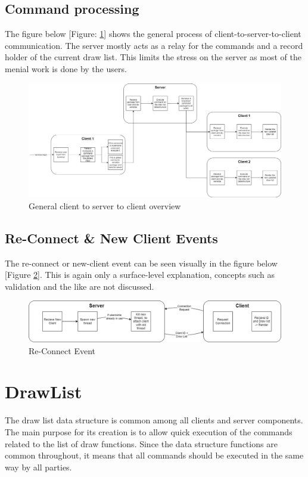 \documentclass[12pt, a4paper]{report}
\begin{document}
\section{Command processing}
The figure below [Figure: \ref{GCSC}] shows the general process of client-to-server-to-client communication. The server mostly acts as a relay for the commands and a record holder of the current draw list. This limits the stress on the server as most of the menial work is done by the users.
\begin{figure}[!htp]
    \centering
    \includegraphics[width=15cm]{Server To Client General.drawio.png}
    \caption{General client to server to client overview}
    \label{GCSC}
\end{figure}

\section{Re-Connect \& New Client Events}
The re-connect or new-client event can be seen visually in the figure below [Figure \ref{RC}]. This is again only a surface-level explanation, concepts such as validation and the like are not discussed.
\begin{figure}[!htp]
    \centering
    \includegraphics[width=15cm]{Re-Connect Event.drawio.png}
    \caption{Re-Connect Event}
    \label{RC}
\end{figure}

\chapter{DrawList}
The draw list data structure is common among all clients and server components. The main purpose for its creation is to allow quick execution of the commands related to the list of draw functions. Since the data structure functions are common throughout, it means that all commands should be executed in the same way by all parties.
\end{document}
